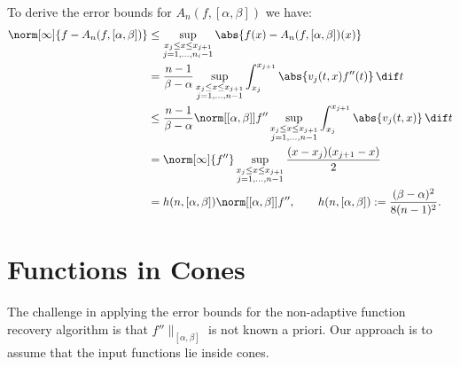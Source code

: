 \documentclass[]{elsarticle}
\theoremstyle{definition}
\theoremstyle{remark}
\begin{document}
To derive the error bounds for $A_{n}(f,[\alpha,\beta])$ we have:
\begin{align*}
\norm[\infty]{f-A_{n}(f,[\alpha,\beta])}
& \le \sup_{\substack{x_j \le x \le x_{j+1}\\ j=1, \ldots, n_i-1 }} \abs{f(x)-A_{n}(f,[\alpha,\beta])(x)}\\
&= \frac{n-1}{\beta-\alpha} \sup_{\substack{x_j \le x \le x_{j+1}\\ j=1, \ldots, n-1 }}  \int_{x_j}^{x_{j+1}} \abs{v_j(t,x) f''(t)} \, \dif t\\
&\le \frac{n-1}{\beta-\alpha} \norm[{[\alpha, \beta]}]{f''} \sup_{\substack{x_j \le x \le x_{j+1}\\ j=1, \ldots, n-1 }}  \int_{x_j}^{x_{j+1}} \abs{v_j(t,x)} \, \dif t\\
&=\norm[\infty]{f''} \sup_{\substack{x_j \le x \le x_{j+1}\\ j=1, \ldots, n-1 }}  \frac{(x-x_j)(x_{j+1}-x)}2 \\
&= h(n,[\alpha,\beta]) \norm[{[\alpha, \beta]}]{f''}, \qquad  h(n,[\alpha,\beta]):= \frac{(\beta-\alpha)^2}{8(n-1)^2}.
\end{align*}

\section{Functions in Cones}
The challenge in applying the error bounds for the non-adaptive function recovery algorithm is that $ f'' \bigr \rVert_{[\alpha,\beta]} $ is not known a priori.  Our approach is to assume that the input functions lie inside cones. 
\end{document}
